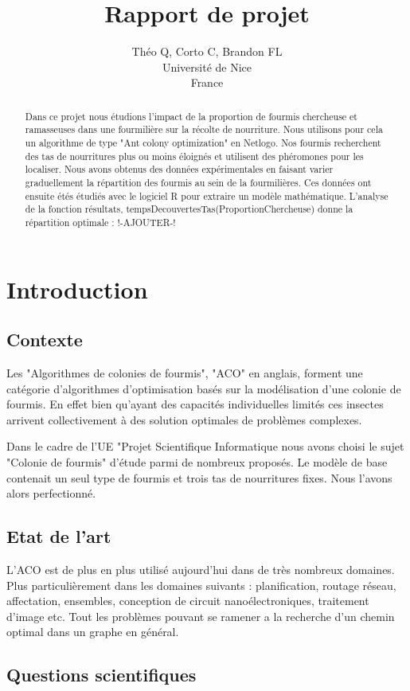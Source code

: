 \documentclass{article}
\title{Rapport de projet}
\author{Théo Q, Corto C, Brandon FL \\
Université de Nice\\
France}
\begin{document}
\maketitle


\begin{abstract}
Dans ce projet nous étudions l'impact de la proportion de fourmis chercheuse et ramasseuses dans une fourmilière sur la récolte de nourriture. Nous utilisons pour cela un algorithme de type "Ant colony optimization" en Netlogo. Nos fourmis recherchent des tas de nourritures plus ou moins éloignés et utilisent des phéromones pour les localiser. Nous avons obtenus des données expérimentales en faisant varier graduellement la répartition des fourmis au sein de la fourmilières. Ces données ont ensuite étés  étudiés avec le logiciel R pour extraire un modèle mathématique. L'analyse de la fonction résultats, tempsDecouvertesTas(ProportionChercheuse) donne la répartition optimale :  !-AJOUTER-!
\end{abstract}
\section{Introduction}
\subsection{Contexte}
Les "Algorithmes de colonies de fourmis", "ACO" en anglais, forment une catégorie d'algorithmes d'optimisation basés sur la modélisation d'une colonie de fourmis. En effet bien qu'ayant des capacités individuelles limités ces insectes arrivent collectivement à des solution optimales de problèmes complexes. 



Dans le cadre de l'UE "Projet Scientifique Informatique nous avons choisi le sujet "Colonie de fourmis" d'étude parmi de nombreux proposés. Le modèle de base contenait un seul type de fourmis et trois tas de nourritures fixes. Nous l'avons alors perfectionné.
\subsection{Etat de l'art}
L'ACO est de plus en plus utilisé aujourd'hui dans de très nombreux domaines. Plus particulièrement dans les domaines suivants : planification, routage réseau, affectation, ensembles, conception de circuit nanoélectroniques, traitement d'image etc. Tout les problèmes pouvant se ramener a la recherche d'un chemin optimal dans un graphe en général.
\subsection{Questions scientifiques}
\end{document}
